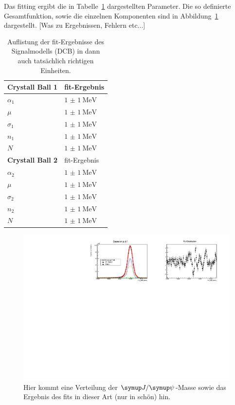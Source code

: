 Das fitting ergibt die in Tabelle~\ref{tab:fit2} dargestellten Parameter. Die so definierte Gesamtfunktion, sowie die einzelnen Komponenten sind in Abbildung~\ref{fig:fit2} dargestellt. [Was zu Ergebnissen, Fehlern etc...]
%
\begin{table}[H]
  \centering
  \caption{Auflistung der fit-Ergebnisse des Signalmodells (DCB) in dann auch tatsächlich richtigen Einheiten.}
  \begin{tabular}{ll}
    \toprule
    \textbf{Crystall Ball 1}      &  fit-Ergebnis \\
    \midrule
    \quad$\alpha_1$               & $\SI{1(1)}{\mega\electronvolt}$ \\
    \quad$\mu$                    & $\SI{1(1)}{\mega\electronvolt}$ \\
    \quad$\sigma_1$               & $\SI{1(1)}{\mega\electronvolt}$ \\
    \quad$n_1$                    & $\SI{1(1)}{\mega\electronvolt}$ \\
    \quad$N$                      & $\SI{1(1)}{\mega\electronvolt}$ \\
    \midrule
    \textbf{Crystall Ball 2}      &  fit-Ergebnis \\
    \midrule
    \quad$\alpha_2$               & $\SI{1(1)}{\mega\electronvolt}$ \\
    \quad$\mu$                    & $\SI{1(1)}{\mega\electronvolt}$ \\
    \quad$\sigma_2$               & $\SI{1(1)}{\mega\electronvolt}$ \\
    \quad$n_2$                    & $\SI{1(1)}{\mega\electronvolt}$ \\
    \quad$N$                      & $\SI{1(1)}{\mega\electronvolt}$ \\
    \bottomrule
  \end{tabular}
  \label{tab:fit2}
\end{table}
%
\begin{figure}[H]
  \centering
      \includegraphics[width=1.2\textwidth]{Plots/BKGexp.pdf}
  \caption{Hier kommt eine Verteilung der $\jpsi$-Masse sowie das Ergebnis des fits in dieser Art (nur in schön) hin.}
  \label{fig:fit2}
\end{figure}
%
